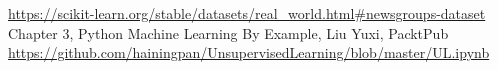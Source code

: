\documentclass{article}
\begin{document}
    \begin{thebibliography}{9}
        \hyperref{https://scikit-learn.org/stable/datasets/real\_world.html\#newsgroups-dataset}{}{}{https://scikit-learn.org/stable/datasets/real\_world.html\#newsgroups-dataset}
        Chapter 3, Python Machine Learning By Example, Liu Yuxi, PacktPub
        \hyperref{https://github.com/hainingpan/UnsupervisedLearning/blob/master/UL.ipynb}{}{}{https://github.com/hainingpan/UnsupervisedLearning/blob/master/UL.ipynb}

    \end{thebibliography}
\end{document}

